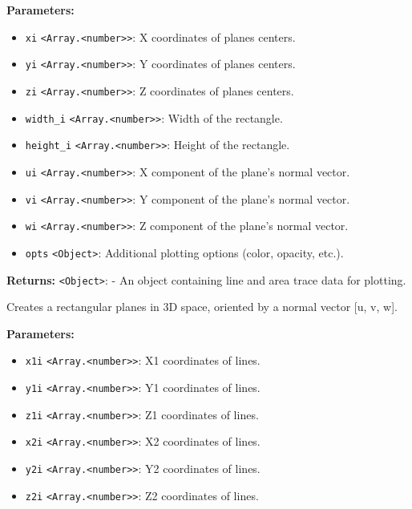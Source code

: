 \documentclass[12pt,a4paper]{article}
\begin{document}
\noindent \textbf{Parameters:}
\begin{itemize}
  \item \texttt{xi} \texttt{<Array.<number>>}: X coordinates of planes centers.
  \item \texttt{yi} \texttt{<Array.<number>>}: Y coordinates of planes centers.
  \item \texttt{zi} \texttt{<Array.<number>>}: Z coordinates of planes centers.
  \item \texttt{width\_i} \texttt{<Array.<number>>}: Width of the rectangle.
  \item \texttt{height\_i} \texttt{<Array.<number>>}: Height of the rectangle.
  \item \texttt{ui} \texttt{<Array.<number>>}: X component of the plane's normal vector.
  \item \texttt{vi} \texttt{<Array.<number>>}: Y component of the plane's normal vector.
  \item \texttt{wi} \texttt{<Array.<number>>}: Z component of the plane's normal vector.
  \item \texttt{opts} \texttt{<Object>}: Additional plotting options (color, opacity, etc.).
\end{itemize}

\noindent \textbf{Returns:} \texttt{<Object>}: - An object containing line and area trace data for plotting.

\noindent Creates a rectangular planes in 3D space, oriented by a normal vector [u, v, w].

\vspace{5mm}
\noindent {}


\noindent \textbf{Parameters:}
\begin{itemize}
  \item \texttt{x1i} \texttt{<Array.<number>>}: X1 coordinates of lines.
  \item \texttt{y1i} \texttt{<Array.<number>>}: Y1 coordinates of lines.
  \item \texttt{z1i} \texttt{<Array.<number>>}: Z1 coordinates of lines.
  \item \texttt{x2i} \texttt{<Array.<number>>}: X2 coordinates of lines.
  \item \texttt{y2i} \texttt{<Array.<number>>}: Y2 coordinates of lines.
  \item \texttt{z2i} \texttt{<Array.<number>>}: Z2 coordinates of lines.
\end{itemize}
\end{document}
